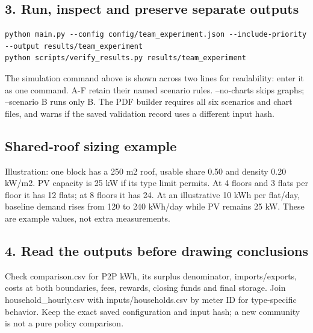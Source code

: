 \documentclass[a4paper,11pt]{article}
\begin{document}
\subsection*{3. Run, inspect and preserve separate outputs}
\par\medskip

\begin{lstlisting}
python main.py --config config/team_experiment.json --include-priority --output results/team_experiment
python scripts/verify_results.py results/team_experiment
\end{lstlisting}

The simulation command above is shown across two lines for readability: enter it as one command. A-F retain their named scenario rules. --no-charts skips graphs; --scenario B runs only B. The PDF builder requires all six scenarios and chart files, and warns if the saved validation record uses a different input hash.
\par\medskip

\subsection*{Shared-roof sizing example}
\par\medskip

Illustration: one block has a 250 m2 roof, usable share 0.50 and density 0.20 kW/m2. PV capacity is 25 kW if its type limit permits. At 4 floors and 3 flats per floor it has 12 flats; at 8 floors it has 24. At an illustrative 10 kWh per flat/day, baseline demand rises from 120 to 240 kWh/day while PV remains 25 kW. These are example values, not extra measurements.
\par\medskip

\subsection*{4. Read the outputs before drawing conclusions}
\par\medskip

Check comparison.csv for P2P kWh, its surplus denominator, imports/exports, costs at both boundaries, fees, rewards, closing funds and final storage. Join household\_hourly.csv with inputs/households.csv by meter ID for type-specific behavior. Keep the exact saved configuration and input hash; a new community is not a pure policy comparison.
\par\medskip

\clearpage
\end{document}
